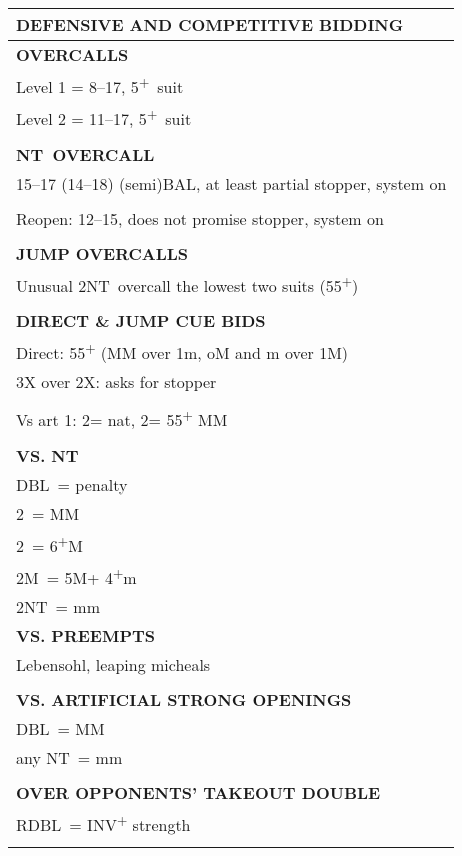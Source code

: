 \documentclass{article}
\newcommand{\C}{\texorpdfstring{\textcolor{ForestGreen}{\raisebox{-0.017em}{\ensuremath{\varclub}}}}{C}}
\newcommand{\D}{\texorpdfstring{\textcolor{YellowOrange}{\raisebox{-0.35pt}{\ensuremath{\vardiamond}}}}{D}}
\renewcommand{\H}{\texorpdfstring{\textcolor{Red}{\raisebox{-0.06em}{\ensuremath{\varheart}}}}{H}}
\newcommand\N{{\footnotesize NT}}
\newcommand{\+}{\textsuperscript{+}}
\newcommand{\X}{{\footnotesize{DBL}}}
\newcommand{\XX}{{\footnotesize{RDBL}}}
\newcommand{\m}{m}
\newcommand{\M}{M}
\begin{document}
\newpage
\noindent
\small
  \begin{adjustbox}{valign=t,minipage={90mm}}
    \begin{tabular}{|p{88mm}|}
      \hline
      \cellcolor[gray]{0.9} \textbf{DEFENSIVE AND COMPETITIVE BIDDING} \\ \hline
      \textbf{OVERCALLS} \\ \hline
      Level 1 = 8--17, 5\+\ suit\\
      Level 2 = 11--17, 5\+\ suit\\
      \\
      \hline
      \textbf{\N \ OVERCALL} \\ \hline
      15--17 (14--18) (semi)BAL, at least partial stopper, system on\\
      \\
      Reopen: 12--15, does not promise stopper, system on\\
      \\
      \hline
      \textbf{JUMP OVERCALLS} \\ \hline
      Unusual 2\N\ overcall the lowest two suits (55\+)\\
      \\
      \hline
      \textbf{DIRECT \& JUMP CUE BIDS} \\ \hline
      Direct: 55\+ (MM over 1m, oM and m over 1M)\\
      3X over 2X: asks for stopper\\
      \\
      Vs art 1\D: 2\D = nat, 2\H = 55\+ MM\\
      \\
      \hline
      \textbf{VS. NT} \\ \hline
      \X\ = penalty \\
      2\C\ = MM \\
      2\D\ = 6\+\M \\
      2\M\ = 5\M + 4\+\m\\
      2\N\ = mm \\
      \hline
      \textbf{VS. PREEMPTS} \\ \hline
      Lebensohl, leaping micheals\\
      \\
      \hline
      \textbf{VS. ARTIFICIAL STRONG OPENINGS} \\ \hline
      \X\ = MM \\
      any \N\ = mm\\
      \\
      \hline
      \textbf{OVER OPPONENTS' TAKEOUT DOUBLE} \\ \hline
      \XX\ = INV\+ strength\\
      \\
      \hline
    \end{tabular}
  \end{adjustbox}
\end{document}
